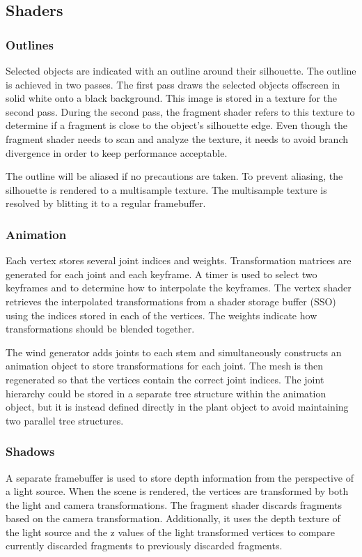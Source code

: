 \documentclass[10pt]{article}
\begin{document}
\subsection{Shaders}
\subsubsection{Outlines}
Selected objects are indicated with an outline around their silhouette. The outline is achieved in two passes. The first pass draws the selected objects offscreen in solid white onto a black background. This image is stored in a texture for the second pass. During the second pass, the fragment shader refers to this texture to determine if a fragment is close to the object's silhouette edge. Even though the fragment shader needs to scan and analyze the texture, it needs to avoid branch divergence in order to keep performance acceptable.

The outline will be aliased if no precautions are taken. To prevent aliasing, the silhouette is rendered to a multisample texture. The multisample texture is resolved by blitting it to a regular framebuffer.

\subsubsection{Animation}

Each vertex stores several joint indices and weights. Transformation matrices are generated for each joint and each keyframe. A timer is used to select two keyframes and to determine how to interpolate the keyframes. The vertex shader retrieves the interpolated transformations from a shader storage buffer (SSO) using the indices stored in each of the vertices. The weights indicate how transformations should be blended together.

The wind generator adds joints to each stem and simultaneously constructs an animation object to store transformations for each joint. The mesh is then regenerated so that the vertices contain the correct joint indices. The joint hierarchy could be stored in a separate tree structure within the animation object, but it is instead defined directly in the plant object to avoid maintaining two parallel tree structures.

\subsubsection{Shadows}

A separate framebuffer is used to store depth information from the perspective of a light source. When the scene is rendered, the vertices are transformed by both the light and camera transformations. The fragment shader discards fragments based on the camera transformation. Additionally, it uses the depth texture of the light source and the z values of the light transformed vertices to compare currently discarded fragments to previously discarded fragments.
\end{document}

